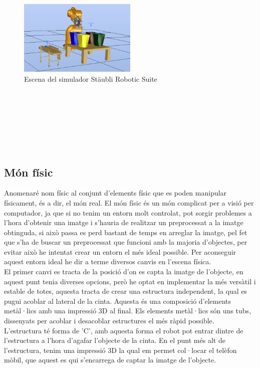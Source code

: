 ﻿\documentclass[10pt,a4paper,twocolumn,twoside]{article}
\begin{document}
\begin{figure}[!h]
 \centering
    \includegraphics[width=0.5\textwidth]{img/simulacio.png}
    \caption{Escena del simulador Stäubli Robotic Suite}
\end{figure}
 \hfill \break
\\
\\
\\
\\
\\
\\
\subsection{Món físic}

Anomenaré nom físic al conjunt d'elements físic que es poden manipular físicament, és a dir, el món real. El món físic és un món complicat per a visió per computador, ja que si no tenim un entorn molt controlat, pot sorgir problemes a l'hora d'obtenir una imatge i s'hauria de realitzar un preprocessat a la imatge obtinguda, si això passa es perd bastant de temps en arreglar la imatge, pel fet que s'ha de buscar un preprocessat que funcioni amb la majoria d'objectes, per evitar això he intentat crear un entorn el més ideal possible. Per aconseguir aquest entorn ideal he dir a terme diversos canvis en l'escena física.
\\

El primer canvi es tracta de la posició d'on es capta la imatge de l'objecte, en aquest punt tenia diverses opcions, però he optat en implementar la més versàtil i estable de totes, aquesta tracta de crear una estructura independent, la qual es pugui acoblar al lateral de la cinta. Aquesta és una composició d'elements metàl·lics amb una impressió 3D al final. Els elements metàl·lics són uns tubs, dissenyats per acoblar i desacoblar estructures el més ràpid possible.
\\

L'estructura té forma de 'C', amb aquesta forma el robot pot entrar dintre de l'estructura a l'hora d'agafar l'objecte de la cinta. En el punt més alt de l'estructura, tenim una impressió 3D la qual em permet col·locar el telèfon mòbil, que aquest es qui s'encarrega de captar la imatge de l'objecte.
\end{document}
